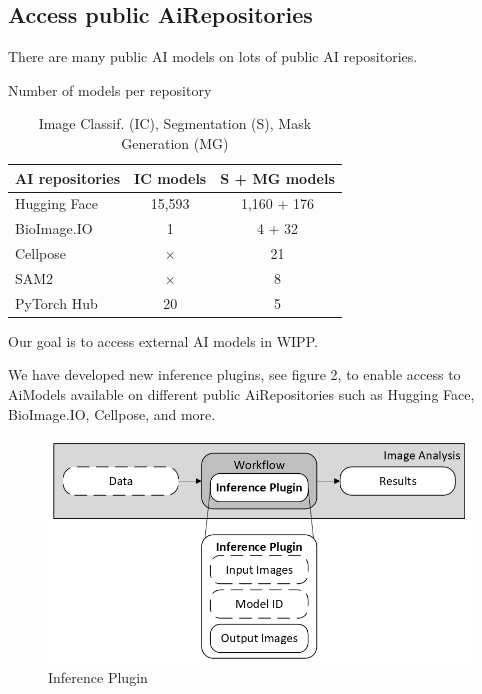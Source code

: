 \subsection{Access public \Gls{AiRepositories}}

There are many public AI models on lots of public AI repositories.

\begin{table}[H]
  \centering
  \caption{Number of models per repository}
  \begin{tabular}{lcc}
    \toprule
    AI repositories & IC models & S + MG models \\
    \midrule
    Hugging Face    & 15,593                      & 1,160 + 176 \\
    BioImage.IO     & 1                           & 4 + 32 \\
    Cellpose        & $\times$                    & 21 \\
    SAM2            & $\times$                    & 8 \\
    PyTorch Hub     & 20                          & 5 \\
    \bottomrule
  \end{tabular}
  \caption*{Image Classif. (IC), Segmentation (S), Mask Generation (MG)}
\end{table}

Our goal is to access external AI models in WIPP.


We have developed new inference plugins, see figure 2, to enable access to
\Gls{AiModel}s available on different public \Gls{AiRepositories} such as
Hugging Face, BioImage.IO, Cellpose, and more.

\begin{figure}[H]
  \centering
  \includegraphics[width=1.0\linewidth]{png/methods/inference_plugin.png}
  \caption{Inference Plugin}
  \label{fig:2inference}
\end{figure}

